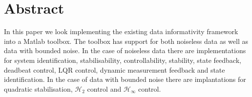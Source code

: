 \section{Abstract}
In this paper we look implementing the existing data informativity framework into a Matlab toolbox. The toolbox has support for both noiseless data as well as data with bounded noise. In the case of noiseless data there are implementations for system identification, stabilisability, controllability, stability, state feedback, deadbeat control, LQR control, dynamic measurement feedback and state identification. In the case of data with bounded noise there are implantations for quadratic stabilisation, $\mathcal{H}_2$ control and $\mathcal{H}_\infty$ control.